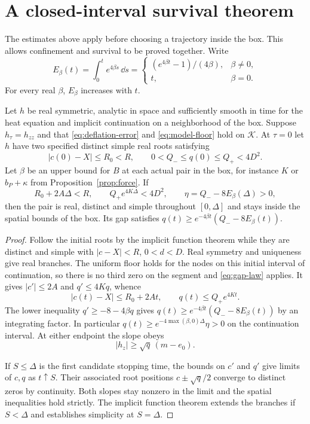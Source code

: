 \section{A closed-interval survival theorem}
\label{sec:survival}

The estimates above apply before choosing a trajectory inside the
box. This allows confinement and survival to be proved together.
Write
\[
E_\beta(t)=\int_0^t e^{4\beta s}\,\dd s
=\begin{cases}
(e^{4\beta t}-1)/(4\beta),&\beta\ne0,\\
t,&\beta=0.
\end{cases}
\]
For every real \(\beta\), \(E_\beta\) increases with \(t\).

\begin{theorem}
\label{thm:survival}
Let \(h\) be real symmetric, analytic in space and sufficiently
smooth in time for the heat equation and implicit continuation on
a neighborhood of the box. Suppose \(h_\tau=h_{zz}\) and that
\eqref{eq:deflation-error} and \eqref{eq:model-floor} hold on
\(\mathcal K\). At \(\tau=0\) let \(h\) have two specified distinct
simple real roots satisfying
\[
|c(0)-X|\le R_0<R,\qquad
0<Q_-\le q(0)\le Q_+<4D^2.
\]
Let \(\beta\) be an upper bound for \(B\) at each actual pair in the
box, for instance \(K\) or \(b_P+\kappa\) from Proposition~\ref{prop:force}.
If
\begin{equation}
\label{eq:survival-margins}
R_0+2A\Delta<R,\qquad
Q_+e^{4K\Delta}<4D^2,\qquad
\eta=Q_- -8E_\beta(\Delta)>0 ,
\end{equation}
then the pair is real, distinct and simple throughout
\([0,\Delta]\) and stays inside the spatial bounds of the box.
Its gap satisfies \(q(t)\ge e^{-4\beta t}(Q_- -8E_\beta(t))\).
\end{theorem}

\begin{proof}
Follow the initial roots by the implicit function theorem while
they are distinct and simple with \(|c-X|<R\), \(0<d<D\).
Real symmetry and uniqueness give real branches. The uniform
floor holds for the nodes on this initial interval of continuation,
so there is no third zero on the segment and \eqref{eq:gap-law}
applies. It gives \(|c'|\le2A\) and \(q'\le4Kq\), whence
\[
|c(t)-X|\le R_0+2At,\qquad q(t)\le Q_+e^{4Kt}.
\]
The lower inequality \(q'\ge -8-4\beta q\) gives
\(q(t)\ge e^{-4\beta t}(Q_- -8E_\beta(t))\) by an integrating
factor. In particular \(q(t)\ge e^{-4\max(\beta,0)\Delta}\eta>0\)
on the continuation interval. At either endpoint the slope obeys
\[
|h_z|\ge\sqrt q\,(m-e_0).
\]

If \(S\le\Delta\) is the first candidate stopping time, the bounds
on \(c'\) and \(q'\) give limits of \(c,q\) as \(t\uparrow S\).
Their associated root positions \(c\pm\sqrt q/2\) converge to
distinct zeros by continuity. Both slopes stay nonzero in the
limit and the spatial inequalities hold strictly. The implicit
function theorem extends the branches if \(S<\Delta\) and
establishes simplicity at \(S=\Delta\).
\end{proof}

